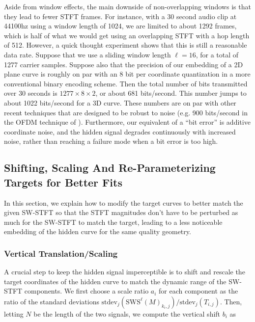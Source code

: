 \documentclass[runningheads]{llncs}
\begin{document}
Aside from window effects, the main downside of non-overlapping windows is that they lead to fewer STFT frames.  For instance, with a 30 second audio clip at 44100hz using a window length of 1024, we are limited to about 1292 frames, which is half of what we would get using an overlapping STFT with a hop length of 512.  However, a quick thought experiment shows that this is still a reasonable data rate.  Suppose that we use a sliding window length $\ell=16$, for a total of 1277 carrier samples.  Suppose also that the precision of our embedding of a 2D plane curve is roughly on par with an 8 bit per coordinate quantization in a more conventional binary encoding scheme.  Then the total number of bits transmitted over 30 seconds is $1277 \times 8 \times 2$, or about 681 bits/second.  This number jumps to about 1022 bits/second for a 3D curve.  These numbers are on par with other recent techniques that are designed to be robust to noise (e.g. 900 bits/second in the OFDM technique of \cite{eichelberger_receiving_2019}).  Furthermore, our equivalent of a ``bit error'' is additive coordinate noise, and the hidden signal degrades continuously with increased noise, rather than reaching a failure mode when a bit error is too high.




\subsection{Shifting, Scaling And Re-Parameterizing Targets for Better Fits}
\label{sec:reparam}

In this section, we explain how to modify the target curves to better match the given SW-STFT so that the STFT magnitudes don't have to be perturbed as much for the SW-STFT to match the target, leading to a less noticeable embedding of the hidden curve for the same quality geometry.

\subsubsection{Vertical Translation/Scaling}

A crucial step to keep the hidden signal imperceptible is to shift and rescale the target coordinates of the hidden curve to match the dynamic range of the SW-STFT components.  We first choose a scale ratio $a_i$ for each component as the ratio of the standard deviations $\text{stdev}_j \left( \text{SWS}^{\ell} (M)_{k_i, j} \right) / \text{stdev}_j (T_{i, j})$.  Then, letting $N$ be the length of the two signals, we compute the vertical shift $b_i$ as
\end{document}
